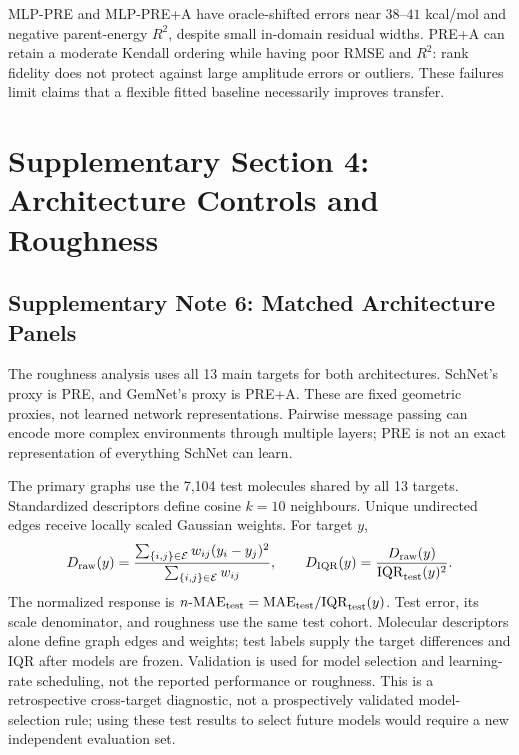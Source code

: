 MLP-PRE and MLP-PRE+A have oracle-shifted errors near \(38\)--\(41\) kcal/mol and negative parent-energy \(R^2\), despite small in-domain residual widths. PRE+A can retain a moderate Kendall ordering while having poor RMSE and \(R^2\): rank fidelity does not protect against large amplitude errors or outliers. These failures limit claims that a flexible fitted baseline necessarily improves transfer.

\clearpage
\section*{Supplementary Section 4: Architecture Controls and Roughness}
\subsection*{Supplementary Note 6: Matched Architecture Panels}
The roughness analysis uses all 13 main targets for both architectures. SchNet's proxy is PRE, and GemNet's proxy is PRE+A. These are fixed geometric proxies, not learned network representations. Pairwise message passing can encode more complex environments through multiple layers; PRE is not an exact representation of everything SchNet can learn.

The primary graphs use the 7,104 test molecules shared by all 13 targets. Standardized descriptors define cosine \(k=10\) neighbours. Unique undirected edges receive locally scaled Gaussian weights. For target \(y\),
\begin{equation}
 D_{\rm raw}(y)=
 \frac{\sum_{\{i,j\}\in\mathcal E}w_{ij}(y_i-y_j)^2}
      {\sum_{\{i,j\}\in\mathcal E}w_{ij}},\qquad
 D_{\rm IQR}(y)=\frac{D_{\rm raw}(y)}{{\rm IQR}_{\rm test}(y)^2}.
\end{equation}
The normalized response is \(n\text{-MAE}_{\rm test}={\rm MAE}_{\rm test}/{\rm IQR}_{\rm test}(y)\). Test error, its scale denominator, and roughness use the same test cohort. Molecular descriptors alone define graph edges and weights; test labels supply the target differences and IQR after models are frozen. Validation is used for model selection and learning-rate scheduling, not the reported performance or roughness. This is a retrospective cross-target diagnostic, not a prospectively validated model-selection rule; using these test results to select future models would require a new independent evaluation set.

